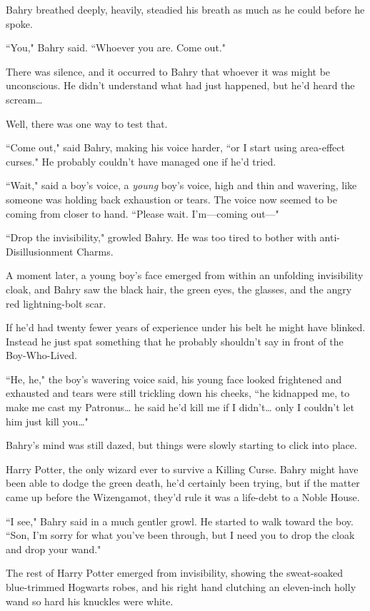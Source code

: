 Bahry breathed deeply, heavily, steadied his breath as much as he could before he spoke.

``You," Bahry said. ``Whoever you are. Come out."

There was silence, and it occurred to Bahry that whoever it was might be unconscious. He didn't understand what had just happened, but he'd heard the scream{\ldots}

Well, there was one way to test that.

``Come out," said Bahry, making his voice harder, ``or I start using area-effect curses." He probably couldn't have managed one if he'd tried.

``Wait," said a boy's voice, a \emph{young} boy's voice, high and thin and wavering, like someone was holding back exhaustion or tears. The voice now seemed to be coming from closer to hand. ``Please wait. I'm---coming out---"

``Drop the invisibility," growled Bahry. He was too tired to bother with anti-Disillusionment Charms.

A moment later, a young boy's face emerged from within an unfolding invisibility cloak, and Bahry saw the black hair, the green eyes, the glasses, and the angry red lightning-bolt scar.

If he'd had twenty fewer years of experience under his belt he might have blinked. Instead he just spat something that he probably shouldn't say in front of the Boy-Who-Lived.

``He, he," the boy's wavering voice said, his young face looked frightened and exhausted and tears were still trickling down his cheeks, ``he kidnapped me, to make me cast my Patronus{\ldots} he said he'd kill me if I didn't{\ldots} only I couldn't let him just kill you{\ldots}"

Bahry's mind was still dazed, but things were slowly starting to click into place.

Harry Potter, the only wizard ever to survive a Killing Curse. Bahry might have been able to dodge the green death, he'd certainly been trying, but if the matter came up before the Wizengamot, they'd rule it was a life-debt to a Noble House.

``I see," Bahry said in a much gentler growl. He started to walk toward the boy. ``Son, I'm sorry for what you've been through, but I need you to drop the cloak and drop your wand."

The rest of Harry Potter emerged from invisibility, showing the sweat-soaked blue-trimmed Hogwarts robes, and his right hand clutching an eleven-inch holly wand so hard his knuckles were white.

